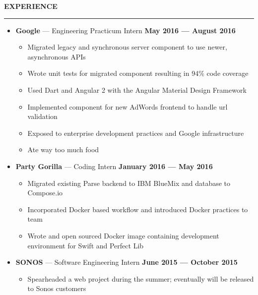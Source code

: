 \documentclass[10pt, oneside]{letter}
\newcommand{\linespaceshit} {
    \vspace{0.05in}
    \hrule
    \vspace{0.05in}
}
\begin{document}
    \textbf{EXPERIENCE}
    \linespaceshit
        \begin{adjustwidth}{0.1in}{0pt}

            \begin{itemize}
                \item
                    \textbf{Google} --- Engineering Practicum Intern \hfill  \textbf{May 2016 --- August 2016}
                        \begin{itemize}
                            \item Migrated legacy and synchronous server component to use newer, asynchronous APIs
                            \item Wrote unit tests for migrated component resulting in 94\% code coverage
                            \item Used Dart and Angular 2 with the Angular Material Design Framework
                            \item Implemented component for new AdWords frontend to handle url validation
                            \item Exposed to enterprise development practices and Google infrastructure
                            \item Ate way too much food
                        \end{itemize}
                \item
                    \textbf{Party Gorilla} --- Coding Intern \hfill \textbf{January 2016 --- May 2016}
                        \begin{itemize}
                            \item Migrated existing Parse backend to IBM BlueMix and database to Compose.io
                            \item Incorporated Docker based workflow and introduced Docker practices to team
                            \item Wrote and open sourced Docker image containing development environment for Swift and Perfect Lib
                        \end{itemize}
                \item
                    \textbf{SONOS} --- Software Engineering Intern \hfill \textbf{June 2015 --- October 2015}
                        \begin{itemize}
                            \item Spearheaded a web project during the summer; eventually will be released to Sonos customers

\end{itemize}
\end{itemize}
\end{adjustwidth}
\end{document}
